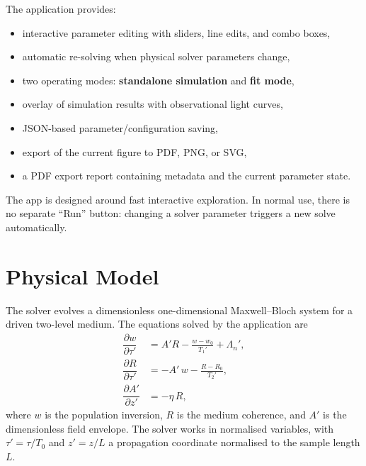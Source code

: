 \documentclass[12pt,a4paper]{article}
\newcommand{\T}{T_0}
\newcommand{\pderiv}[2]{\dfrac{\partial #1}{\partial #2}}
\begin{document}
The application provides:
\begin{itemize}[noitemsep]
  \item interactive parameter editing with sliders, line edits, and combo boxes,
  \item automatic re-solving when physical solver parameters change,
  \item two operating modes: \textbf{standalone simulation} and \textbf{fit mode},
  \item overlay of simulation results with observational light curves,
  \item JSON-based parameter/configuration saving,
  \item export of the current figure to PDF, PNG, or SVG,
  \item a PDF export report containing metadata and the current parameter state.
\end{itemize}

\begin{notebox}
The app is designed around fast interactive exploration. In normal use, there is no separate
``Run'' button: changing a solver parameter triggers a new solve automatically.
\end{notebox}

\section{Physical Model}
\label{sec:model}

The solver evolves a dimensionless one-dimensional Maxwell--Bloch system
for a driven two-level medium. The equations solved by the application are
\begin{align}
  \pderiv{w}{\tau'}
    &= A'R - \frac{w - w_0}{T_1'} + \Lambda_n',
  \label{eq:realw}\\[8pt]
  \pderiv{R}{\tau'}
    &= -A'\,w - \frac{R - R_0}{T_2'},
  \label{eq:realR}\\[8pt]
  \pderiv{A'}{z'}
    &= -\eta\, R,
  \label{eq:realA}
\end{align}
where $w$ is the population inversion, $R$ is the medium coherence, and
$A'$ is the dimensionless field envelope. The solver works in normalised
variables, with $\tau' = \tau/\T$ and $z' = z/L$ a propagation coordinate
normalised to the sample length $L$.
\end{document}
